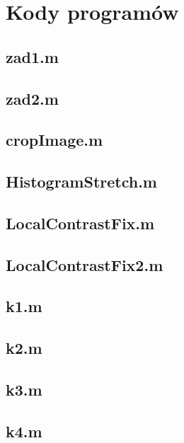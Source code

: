 \newpage \section*{Kody programów}

      


\subsection*{ zad1.m                }   \newpage
\subsection*{ zad2.m                }   \newpage
\subsection*{ cropImage.m           }   \newpage
\subsection*{ HistogramStretch.m    }   \newpage
\subsection*{ LocalContrastFix.m    }   \newpage
\subsection*{ LocalContrastFix2.m   }   \newpage
\subsection*{ k1.m                  }   \newpage
\subsection*{ k2.m                  }   \newpage
\subsection*{ k3.m                  }   \newpage
\subsection*{ k4.m                  }   \newpage






